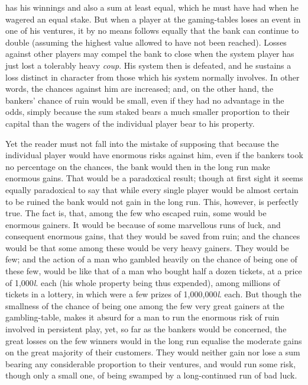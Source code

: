 \documentclass[letterpaper,12pt,oneside,openany]{memoir}
\begin{document}
has his winnings and also a sum at least equal, which
he must have had when he wagered an equal stake.
But when a player at the gaming-tables loses an event
in one of his ventures, it by no means follows equally
that the bank can continue to double (assuming the
highest value allowed to have not been reached). Losses
against other players may compel the bank to close when
the system player has just lost a tolerably heavy \textit{coup}.
His system then is defeated, and he sustains a loss
distinct in character from those which his system normally
involves. In other words, the chances against
him are increased; and, on the other hand, the bankers'
chance of ruin would be small, even if they had no
advantage in the odds, simply because the sum staked
bears a much smaller proportion to their capital than the
wagers of the individual player bear to his property.

Yet the reader must not fall into the mistake of
supposing that because the individual player would have
enormous risks against him, even if the bankers took no
percentage on the chances, the bank would then in the
long run make enormous gains. That would be a paradoxical
result; though at first sight it seems equally
paradoxical to say that while every single player would
be almost certain to be ruined the bank would not
gain in the long run. This, however, is perfectly true.
The fact is, that, among the few who escaped ruin, some
would be enormous gainers. It would be because of
some marvellous runs of luck, and consequent enormous
gains, that they would be saved from ruin; and the
chances would be that some among these would be very
heavy gainers. They would be few; and the action of a
man who gambled heavily on the chance of being one of
these few, would be like that of a man who bought
half a dozen tickets, at a price of 1,000\textit{l}. each (his whole
property being thus expended), among millions of
tickets in a lottery, in which were a few prizes of
1,000,000\textit{l}. each. But though the smallness of the
chance of being one among the few very great gainers at
the gambling-table, makes it absurd for a man to run the
enormous risk of ruin involved in persistent play, yet,
so far as the bankers would be concerned, the great
losses on the few winners would in the long run equalise
the moderate gains on the great majority of their
customers. They would neither gain nor lose a sum
bearing any considerable proportion to their ventures,
and would run some risk, though only a small one,
of being swamped by a long-continued run of bad
luck.
\end{document}
